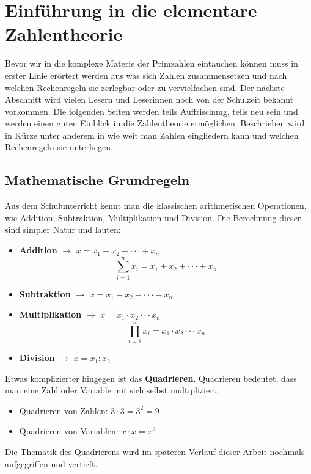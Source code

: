 \documentclass[german,12pt,a4paper]{article}
\begin{document}
\setcounter{section}{0}
\setcounter{page}{1}
\section{Einführung in die elementare Zahlentheorie}
Bevor wir in die komplexe Materie der Primzahlen eintauchen können muss in erster Linie erörtert werden aus was sich Zahlen zusammensetzen und nach welchen Rechenregeln sie zerlegbar oder zu vervielfachen sind. Der nächste Abschnitt wird vielen Lesern und Leserinnen noch von der Schulzeit bekannt vorkommen. Die folgenden Seiten werden teils Auffrischung, teils neu sein und werden einen guten Einblick in die Zahlentheorie ermöglichen. Beschrieben wird in Kürze unter anderem in wie weit man Zahlen eingliedern kann und welchen Rechenregeln sie unterliegen.

\subsection{Mathematische Grundregeln}
Aus dem Schulunterricht kennt man die klassischen arithmetischen Operationen, wie Addition, Subtraktion, Multiplikation und Division. Die Berechnung dieser sind simpler Natur und lauten:
\begin{itemize}
\item \textbf{Addition} $\to$ $x = x_{1} + x_{2} + \cdot\cdot\cdot + x_{n}$
\[\sum_{i=1}^n x_{i} = x_{1} + x_{2} +  \cdot\cdot\cdot + x_{n}\]

\item \textbf{Subtraktion} $\to$ $x = x_{1} - x_{2} - \cdot\cdot\cdot - x_{n}$

\item \textbf{Multiplikation} $\to$ $x = x_{1} \cdot x_{2} \cdot\cdot\cdot x_{n}$
\[\prod_{i=1}^n x_{i} = x_{1} \cdot x_{2} \cdot\cdot\cdot x_{n}\]

\item \textbf{Division} $\to$ $x = x_{1} : x_{2}$
\end{itemize}

Etwas komplizierter hingegen ist das \textbf{Quadrieren}. Quadrieren bedeutet, dass man eine Zahl oder Variable mit sich selbst multipliziert.
\begin{itemize}
\item Quadrieren von Zahlen: $3 \cdot 3 = 3^2 = 9$
\item Quadrieren von Variablen: $x \cdot x = x^2$
\end{itemize}
Die Thematik des Quadrierens wird im späteren Verlauf dieser Arbeit nochmals aufgegriffen und vertieft. 
\end{document}
